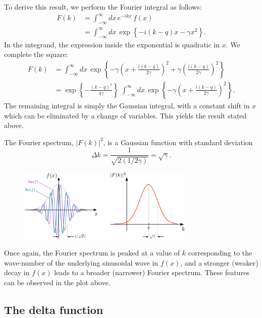 \documentclass[10pt,a4paper]{article}
\begin{document}
To derive this result, we perform the Fourier integral as follows:
\begin{align}
  F(k) &= \int_{-\infty}^\infty dx \, e^{-ikx}\, f(x) \\
  &= \int_{-\infty}^\infty dx \, \exp\left\{-i(k-q)x -\gamma x^2\right\}.
\end{align}
In the integrand, the expression inside the exponential is quadratic in
$x$. We complete the square:
\begin{align}
  F(k) &= \int_{-\infty}^\infty dx \,
  \exp\left\{-\gamma\left(x + \frac{i(k-q)}{2\gamma}\right)^2 + \gamma\left(\frac{i(k-q)}{2\gamma}\right)^2\right\} \\
  &= \exp\left\{ - \frac{(k-q)^2}{4\gamma}\right\}\; \int_{-\infty}^\infty dx \, \exp\left\{-\gamma\left(x + \frac{i(k-q)}{2\gamma}\right)^2\right\}.
\end{align}
The remaining integral is simply the Gaussian integral, with a
constant shift in $x$ which can be eliminated by a change of
variables. This yields the result stated above.

The Fourier spectrum, $|F(k)|^2$, is a Gaussian function with standard
deviation
\begin{equation}
\Delta k = \frac{1}{\sqrt{2(1/2\gamma)}} = \sqrt{\gamma}.
\end{equation}

\begin{figure}[h]
  \centering\includegraphics[width=0.75\textwidth]{fourier_example4}
\end{figure}

\noindent
Once again, the Fourier spectrum is peaked at a value of $k$
corresponding to the wave-number of the underlying sinusoidal wave in
$f(x)$, and a stronger (weaker) decay in $f(x)$ leads to a broader
(narrower) Fourier spectrum. These features can be observed in the
plot above.

\subsection{The delta function}
\label{delta-function}
\end{document}
